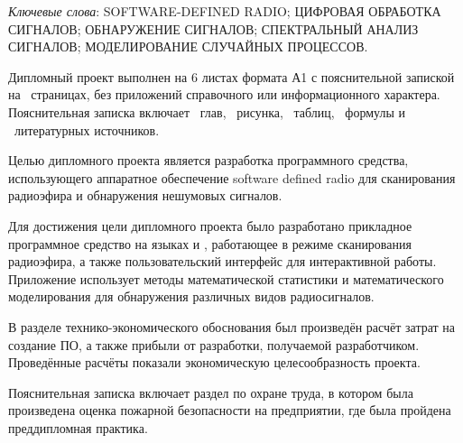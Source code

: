\thispagestyle{empty}

\emph{Ключевые слова}: \MakeUppercase{software-defined radio; цифровая обработка сигналов; обнаружение сигналов; спектральный анализ сигналов; моделирование случайных процессов}.

\vspace{4\parsep}

Дипломный проект выполнен на 6 листах формата А1 с пояснительной запиской на~\pageref*{LastPage} страницах, без приложений справочного или информационного характера. 
Пояснительная записка включает ~глав, \totfig{}~рисунка, \tottab{}~таблиц, \toteq{}~формулы и \totref{}~литературных источников.

Целью дипломного проекта является разработка программного средства, использующего аппаратное обеспечение software defined radio для сканирования радиоэфира и обнаружения нешумовых сигналов.

Для достижения цели дипломного проекта было разработано прикладное программное средство на языках \python{} и \purec{}, работающее в режиме сканирования радиоэфира, а также пользовательский интерфейс для интерактивной работы.
Приложение использует методы математической статистики и математического моделирования для обнаружения различных видов радиосигналов.

В разделе технико-экономического обоснования был произведён расчёт затрат на создание ПО, а также прибыли от разработки, получаемой разработчиком.
Проведённые расчёты показали экономическую целесообразность проекта.

Пояснительная записка включает раздел по охране труда, в котором была произведена оценка пожарной безопасности на предприятии, где была пройдена преддипломная практика.

\clearpage
